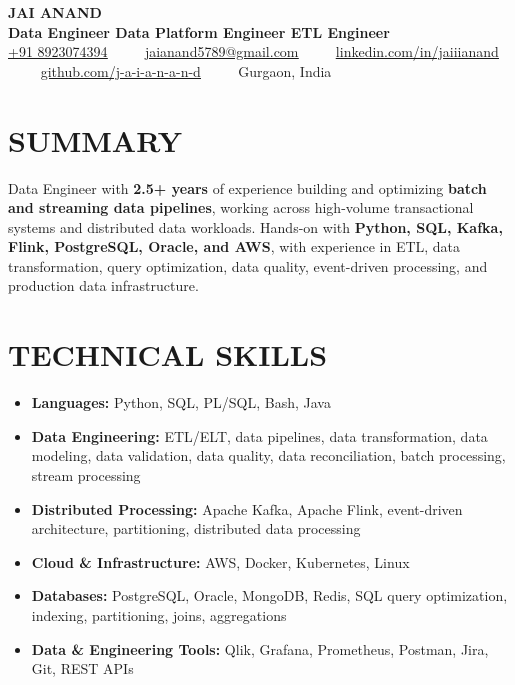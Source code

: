\documentclass[letterpaper,10pt]{article}
\renewcommand{\normalsize}{%
  \fontsize{10.1}{12.25}\selectfont
}
\begin{document}
\begin{center}
    {\Huge \textbf{JAI ANAND}} \\ \vspace{4pt}
    \large \textbf{Data Engineer \textbar{} Data Platform Engineer \textbar{} ETL Engineer } \\ \vspace{6pt}
    \small
    \href{tel:+918923074394}{\underline{+91 8923074394}} ~~\textbullet~~ 
    \href{mailto:jaianand5789@gmail.com}{\underline{jaianand5789@gmail.com}} ~~\textbullet~~ 
    \href{https://linkedin.com/in/jaiiianand/}{\underline{linkedin.com/in/jaiiianand}} ~~\textbullet~~ 
    \href{https://github.com/j-a-i-a-n-a-n-d}{\underline{github.com/j-a-i-a-n-a-n-d}} ~~\textbullet~~
    Gurgaon, India
\end{center}

\section{SUMMARY}
Data Engineer with \textbf{2.5+ years} of experience building and optimizing \textbf{batch and streaming data pipelines}, working across high-volume transactional systems and distributed data workloads. Hands-on with \textbf{Python, SQL, Kafka, Flink, PostgreSQL, Oracle, and AWS}, with experience in ETL, data transformation, query optimization, data quality, event-driven processing, and production data infrastructure.

\section{TECHNICAL SKILLS}
  \begin{itemize}[leftmargin=0.0in, label={}, itemsep=1pt, parsep=0pt, topsep=0pt]
    \item \normalsize{
     \textbf{\normalsize Languages:}{ Python, SQL, PL/SQL, Bash, Java}
    }
    \item \normalsize{
     \textbf{\normalsize Data Engineering:}{ ETL/ELT, data pipelines, data transformation, data modeling, data validation, data quality, data reconciliation, batch processing, stream processing}
    }
    \item \normalsize{
     \textbf{\normalsize Distributed Processing:}{ Apache Kafka, Apache Flink, event-driven architecture, partitioning, distributed data processing}
    }
    \item \normalsize{
     \textbf{\normalsize Cloud \& Infrastructure:}{ AWS, Docker, Kubernetes, Linux}
    }
    \item \normalsize{
     \textbf{\normalsize Databases:}{ PostgreSQL, Oracle, MongoDB, Redis, SQL query optimization, indexing, partitioning, joins, aggregations}
    }
    \item \normalsize{
     \textbf{\normalsize Data \& Engineering Tools:}{ Qlik, Grafana, Prometheus, Postman, Jira, Git, REST APIs}
    }
  \end{itemize}
\end{document}
